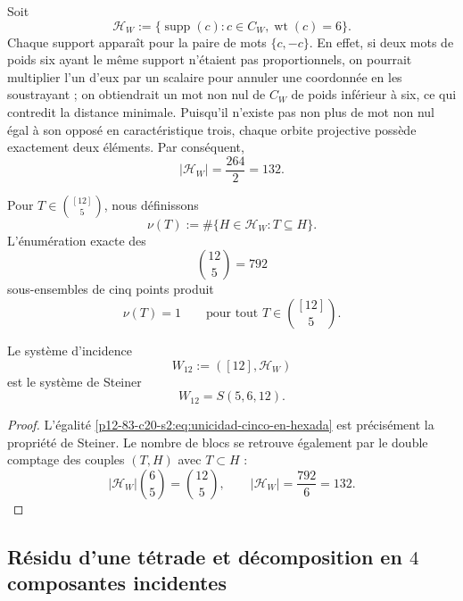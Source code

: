 Soit
\begin{equation}
 \mathcal H_W
 :=\{\operatorname{supp}(c):c\in C_W,
                              \operatorname{wt}(c)=6\}.
 \label{p12-83-c20-s2:eq:familia-soportes-peso-seis}
\end{equation}
Chaque support apparaît pour la paire de mots \(\{c,-c\}\). En effet, si deux
mots de poids six ayant le même support n'étaient pas proportionnels, on pourrait
multiplier l'un d'eux par un scalaire pour annuler une coordonnée en les soustrayant ; on obtiendrait
un mot non nul de \(C_W\) de poids inférieur à six, ce qui contredit la distance
minimale. Puisqu'il n'existe pas non plus de mot non nul égal à son opposé en
caractéristique trois, chaque orbite projective possède exactement deux éléments.
Par conséquent,
\begin{equation}
 |\mathcal H_W|=\frac{264}{2}=132.
 \label{p12-83-c20-s2:eq:numero-hexadas-cw}
\end{equation}

Pour \(T\in\binom{[12]}5\), nous définissons
\begin{equation}
 \nu(T):=\#\{H\in\mathcal H_W:T\subseteq H\}.
 \label{p12-83-c20-s2:eq:incidencia-cinco-hexada}
\end{equation}
L'énumération exacte des
\[
 \binom{12}{5}=792
\]
sous-ensembles de cinq points produit
\begin{equation}
 \nu(T)=1
 \qquad
 \text{pour tout }T\in\binom{[12]}5.
 \label{p12-83-c20-s2:eq:unicidad-cinco-en-hexada}
\end{equation}

\begin{theorem}
\label{p12-83-c20-s2:thm:w12-autonomo}
Le système d'incidence
\[
 W_{12}:=([12],\mathcal H_W)
\]
est le système de Steiner
\begin{equation}
 \boxed{W_{12}=S(5,6,12).}
 \label{p12-83-c20-s2:eq:w12-steiner-autonomo}
\end{equation}
\end{theorem}

\begin{proof}
L'égalité \eqref{p12-83-c20-s2:eq:unicidad-cinco-en-hexada} est précisément la
propriété de Steiner. Le nombre de blocs se retrouve également par le double
comptage des couples \((T,H)\) avec \(T\subset H\) :
\[
 |\mathcal H_W|\binom65=\binom{12}{5},
 \qquad
 |\mathcal H_W|=\frac{792}{6}=132.
\]
\end{proof}

\subsection{Résidu d'une tétrade et décomposition en \(4\) composantes incidentes}

